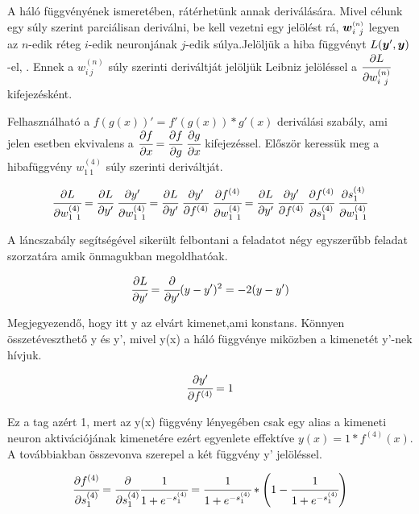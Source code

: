 A háló függvényének ismeretében, rátérhetünk annak deriválására. Mivel célunk egy súly szerint parciálisan deriválni, be kell vezetni egy jelölést rá, $\boldsymbol w^{{\scriptscriptstyle(n)}}_{i~j}$ legyen az $n$-edik réteg $i$-edik neuronjának $j$-edik súlya.Jelöljük a hiba függvényt $L(\boldsymbol y',\boldsymbol y)$-el, . Ennek a $w^{(n)}_{i~j}$ súly szerinti deriváltját jelöljük Leibniz jelöléssel  a $\cfrac{\partial L}{\partial w^{(n)}_{i~j}}$ kifejezésként.  
 

Felhasználható a $f(g(x))' = f'(g(x))*g'(x)$ deriválási szabály, ami jelen esetben ekvivalens a $\cfrac{\partial f}{\partial x} =  \cfrac{\partial f}{\partial g}~ \cfrac{\partial g}{\partial x}$ kifejezéssel.
Először keressük meg a hibafüggvény $w^{(4)}_{1~1}$  súly szerinti deriváltját.

\begin{equation}
    \cfrac{\partial L}{\partial w^{(4)}_{1~1}} = \cfrac{\partial L}{\partial y'}~ \cfrac{\partial y'}{\partial w^{(4)}_{1~1}} = \cfrac{\partial L}{\partial y'}~ \cfrac{\partial y'}{\partial f^{(4)}}~\cfrac{\partial f^{(4)}}{\partial w^{(4)}_{1~1}} = \cfrac{\partial L}{\partial y'}~\cfrac{\partial y'}{\partial f^{(4)}}~\cfrac{\partial f^{(4)}}{\partial s^{(4)}_{1}}~\cfrac{\partial s^{(4)}_{1}}{\partial w^{(4)}_{1~1}}
    \label{derivoutputlayer}
\end{equation}

A láncszabály segítségével sikerült felbontani a feladatot négy egyszerűbb feladat szorzatára amik önmagukban megoldhatóak.

\begin{equation}
    \cfrac{\partial L}{\partial y'} = \cfrac{\partial}{\partial y'}(y-y')^2= -2(y-y') 
\end{equation}

Megjegyezendő, hogy itt y az elvárt kimenet,ami konstans. Könnyen összetéveszthető y és y', mivel y(x) a háló függvénye miközben a kimenetét y'-nek hívjuk. 

\begin{equation}
    \cfrac{\partial y'}{\partial f^{(4)}} = 1
\end{equation}

Ez a tag azért 1, mert az y(x) függvény lényegében csak egy alias a kimeneti neuron aktivációjának kimenetére ezért egyenlete effektíve $y(x) = 1*f^{(4)}(x)$. A továbbiakban összevonva szerepel a két függvény y' jelöléssel.

\begin{equation}
    \cfrac{\partial f^{(4)}}{\partial s^{(4)}_{1}} = \cfrac {\partial}{\partial  s^{(4)}_{1}} \cfrac{1}{1+e^{- s^{(4)}_{1}}} = \cfrac{1}{1+e^{-s^{(4)}_{1}}}* \left(1 - \cfrac{1}{1+e^{-s^{(4)}_{1}}}\right)
\end{equation}

